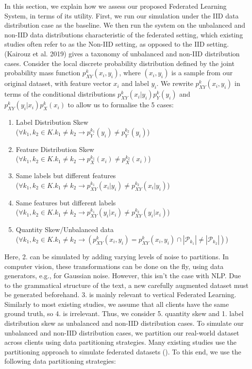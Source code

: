 \documentclass[letterpaper]{article} %
\begin{document}
In this section, we explain how we assess our proposed Federated Learning System, in terms of its utility. First, we run our simulation under the IID data distribution case as the baseline. We then run the system on the unbalanced and non-IID data distributions characteristic of the federated setting, which existing studies often refer to as the Non-IID setting, as opposed to the IID setting. (Kairouz et al. 2019) gives a taxonomy of unbalanced and non-IID distribution cases. Consider the local discrete probability distribution defined by the joint probability mass function $p^k_{XY}(x_i, y_i)$, where $(x_i, y_i)$ is a sample from our original dataset, with feature vector $x_i$ and label $y_i$. We rewrite $p^k_{XY}(x_i, y_i)$  in terms of the conditional distributions $p^k_{XY}(x_i | y_i)p^k_Y(y_i)$ and $p^k_{XY}(y_i | x_i)p^k_X(x_i)$ to allow us to formalise the 5 cases:
\begin{enumerate}
\item Label Distribution Skew \\ ($\forall{k_1, k_2 \in K}. k_1 \neq k_2 \rightarrow p^{k_1}_Y(y_i) \neq p^{k_2}_Y(y_i)$)
\item Feature Distribution Skew \\ ($\forall{k_1, k_2 \in K}. k_1 \neq k_2 \rightarrow p^{k_1}_X(x_i) \neq p^{k_2}_X(x_i)$)
\item Same labels but different features \\ ($\forall{k_1, k_2 \in K}. k_1 \neq k_2 \rightarrow p^{k_1}_{XY}(x_i | y_i) \neq p^{k_2}_{XY}(x_i | y_i)$)
\item Same features but different labels \\ ($\forall{k_1, k_2 \in K}. k_1 \neq k_2 \rightarrow p^{k_1}_{XY}(y_i | x_i) \neq p^{k_2}_{XY}(y_i | x_i)$)
\item Quantity Skew/Unbalanced data \\ ($\forall{k_1, k_2 \in K}. k_1 \neq k_2 \rightarrow (p^k_{XY}(x_i, y_i) = p^k_{XY}(x_i, y_i) \cap |\mathcal{P}_{k_1}| \neq |\mathcal{P}_{k_2}|)$)
\end{enumerate}
Here, 2. can be simulated by adding varying levels of noise to partitions. In computer vision, these transformations can be done on the fly, using data generators, e.g., for Gaussian noise. However, this isn't the case with NLP. Due to the grammatical structure of the text, a new carefully augmented dataset must be generated beforehand. 3. is mainly relevant to vertical Federated Learning. Similarly to most existing studies, we assume that all clients have the same ground truth, so 4. is irrelevant. Thus, we consider 5. quantity skew and 1. label distribution skew as unbalanced and non-IID distribution cases. To simulate our unbalanced and non-IID distribution cases, we partition our real-world dataset across clients using data partitioning strategies. Many existing studies use the partitioning approach to simulate federated datasets (). To this end, we use the following data partitioning strategies:
\end{document}
